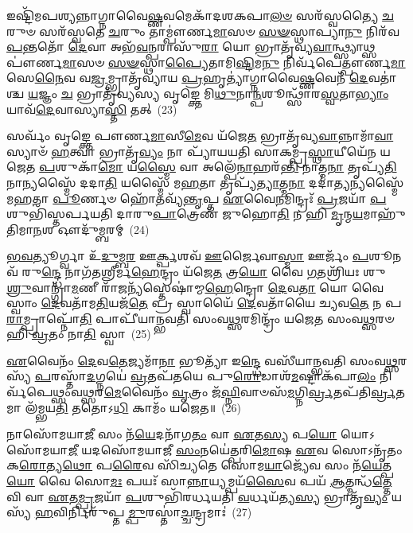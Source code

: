 𑌇𑌷𑍍𑌟𑌿᳴𑌮𑌪𑌶𑍍𑌯𑌨𑍍𑌨𑌾𑌗𑍍𑌨𑌾𑌵𑍈\-\ul{𑌷𑍍𑌣}\-𑌵𑌮𑍇𑌕𑌾᳴\-𑌦𑌶\-𑌕𑌪𑌾\-\ul{𑌲}\-\-\ul{𑍞} 𑌸𑌰᳴𑌸𑍍𑌵𑌤𑍍𑌯𑍈 \ul{𑌚}\-𑌰𑍁𑍞 𑌸𑌰᳴𑌸𑍍𑌵𑌤𑍇 \ul{𑌚}\-𑌰𑍁𑌂 𑌤𑌾𑌮𑍍𑌪𑍗॑𑌰𑍍𑌣\-\ul{𑌮𑌾}\-𑌸𑍞 \ul{𑌸}\-\-\ul{𑍟}\-𑌸𑍍𑌥𑌾𑌪𑍍𑌯𑌾\-\ul{𑌨𑍁} 𑌨𑌿𑌰᳴𑌵\-\ul{𑌪}\-𑌨𑍍𑌤𑌤𑍋᳴ \ul{𑌦𑍇}\-𑌵𑌾 𑌅𑌭᳴\-\ul{𑌵}\-𑌨𑍍𑌪𑌰𑌾𑌸𑍁᳴\-\ul{𑌰𑌾} 𑌯𑍋 𑌭𑍍𑌰𑌾𑌤𑍃᳴𑌵𑍍𑌯\-\ul{𑌵𑌾}\-𑌨𑍍𑌥𑍍𑌸𑍍𑌯𑌾𑌥𑍍𑌸 𑌪𑍗॑𑌰𑍍𑌣\-\ul{𑌮𑌾}\-𑌸𑍞 \ul{𑌸}\-\-\ul{𑍟}\-𑌸𑍍𑌥𑌾\-\ul{𑌪𑍍𑌯𑍈}\-𑌤𑌾𑌮𑌿\-\ul{𑌷𑍍𑌟𑌿}\-𑌮\-\ul{𑌨𑍁} 𑌨𑌿𑌰𑍍𑌵᳴𑌪𑍇𑌤𑍍𑌪𑍗𑌰𑍍𑌣\-\ul{𑌮𑌾}\-𑌸𑍇\-\ul{𑌨𑍈}\-𑌵 𑌵\-\ul{𑌜𑍍𑌰}\-𑌮𑍍𑌭𑍍𑌰𑌾𑌤𑍃᳴𑌵𑍍𑌯𑌾𑌯 \ul{𑌪𑍍𑌰}\-𑌹𑍃𑌤𑍍𑌯𑌾॑𑌗𑍍𑌨𑌾𑌵𑍈\-\ul{𑌷𑍍𑌣}\-𑌵𑍇𑌨᳴ \ul{𑌦𑍇}\-𑌵𑌤𑌾॑𑌶𑍍𑌚 \ul{𑌯}\-𑌜𑍍𑌞𑌂 \ul{𑌚} 𑌭𑍍𑌰𑌾𑌤𑍃᳴𑌵𑍍𑌯𑌸𑍍𑌯 𑌵𑍃𑌙𑍍𑌕𑍍𑌤𑍇 𑌮𑌿\-\ul{𑌥𑍁}\-𑌨𑌾\-\ul{𑌨𑍍𑌪}\-𑌶𑍂𑌨𑍍𑌥𑍍𑌸𑌾᳴𑌰\-\ul{𑌸𑍍𑌵}\-𑌤𑌾\-\ul{𑌭𑍍𑌯𑌾𑌂} 𑌯𑌾𑌵᳴\-\ul{𑌦𑍇}\-𑌵𑌾𑌸𑍍𑌯𑌾\-\ul{𑌸𑍍𑌤𑌿} 𑌤𑌤𑍍~(23)

𑌸𑌰𑍍𑌵𑌂᳴ 𑌵𑍃𑌙𑍍𑌕𑍍𑌤𑍇 𑌪𑍗𑌰𑍍𑌣\-\ul{𑌮𑌾}\-𑌸𑍀\-\ul{𑌮𑍇}\-𑌵 𑌯᳴𑌜𑍇\-\ul{𑌤} 𑌭𑍍𑌰𑌾𑌤𑍃᳴𑌵𑍍𑌯\-\ul{𑌵𑌾}\-𑌨𑍍𑌨𑌾𑌮𑌾᳴\-\ul{𑌵𑌾}\-𑌸𑍍𑌯𑌾𑍞᳴ \ul{𑌹}\-𑌤𑍍𑌵𑌾 𑌭𑍍𑌰𑌾𑌤𑍃᳴\-\ul{𑌵𑍍𑌯𑌂} 𑌨𑌾 𑌪𑍍𑌯𑌾᳴𑌯𑌯𑌤𑌿 𑌸𑌾𑌕𑌮𑍍𑌪𑍍𑌰\-\ul{𑌸𑍍𑌥𑌾}\-𑌯𑍀𑌯𑍇᳴𑌨 𑌯𑌜𑍇𑌤 \ul{𑌪}\-𑌶𑍁𑌕𑌾᳴\-\ul{𑌮𑍋} 𑌯\-\ul{𑌸𑍍𑌮𑍈} 𑌵𑌾 𑌅𑌲𑍍𑌪𑍇᳴\-\ul{𑌨𑌾}\-𑌹𑌰᳴\-\ul{𑌨𑍍𑌤𑌿} 𑌨𑌾𑌤𑍍𑌮\-\ul{𑌨𑌾} 𑌤𑍃𑌪𑍍𑌯᳴\-\ul{𑌤𑌿} 𑌨𑌾𑌨𑍍𑌯𑌸𑍍𑌮𑍈᳴ 𑌦𑌦𑌾\-\ul{𑌤𑌿} 𑌯𑌸𑍍𑌮𑍈᳴ 𑌮\-\ul{𑌹}\-𑌤𑌾 𑌤𑍃𑌪𑍍𑌯᳴\-\ul{𑌤𑍍𑌯𑌾}\-𑌤𑍍𑌮\-\ul{𑌨𑌾} 𑌦𑌦𑌾॑\-\ul{𑌤𑍍𑌯}\-𑌨𑍍𑌯𑌸𑍍𑌮𑍈᳴ 𑌮\-\ul{𑌹}\-𑌤𑌾 \ul{𑌪𑍂}\-𑌰𑍍𑌣𑍞 𑌹𑍋᳴\-\ul{𑌤}\-𑌵𑍍𑌯᳴\-\ul{𑌨𑍍𑌤𑍃}\-𑌪𑍍𑌤 \ul{𑌏}\-𑌵𑍈\-\ul{𑌨}\-𑌮𑌿𑌨𑍍𑌦𑍍𑌰𑌃᳴ \ul{𑌪𑍍𑌰}\-𑌜𑌯𑌾᳴ \ul{𑌪}\-𑌶𑍁𑌭𑌿᳴𑌸𑍍𑌤𑌰𑍍𑌪𑌯𑌤𑌿 𑌦𑌾𑌰𑍁\-\ul{𑌪𑌾}\-𑌤𑍍𑌰𑍇𑌣᳴ 𑌜𑍁𑌹𑍋\-\ul{𑌤𑌿} 𑌨 𑌹𑌿 \ul{𑌮𑍃}\-𑌨𑍍𑌮\-\ul{𑌯}\-𑌮𑌾𑌹𑍁᳴𑌤𑌿𑌮𑌾\-\ul{𑌨}\-𑌶 𑌔𑌦𑍁᳴𑌮𑍍𑌬𑌰𑌮𑍍~(24)

\-\ul{𑌭}\-\-\ul{𑌵}\-𑌤𑍍𑌯𑍂𑌰𑍍𑌗𑍍𑌵𑌾 𑌉᳴\-\ul{𑌦𑍁}\-𑌮𑍍𑌬\-\ul{𑌰} 𑌊\-\ul{𑌰𑍍𑌕𑍍𑌪}\-𑌶𑌵᳴ \ul{𑌊}\-𑌰𑍍𑌜𑍈𑌵𑌾\-\ul{𑌸𑍍𑌮𑌾} 𑌊𑌰𑍍𑌜𑌂᳴ \ul{𑌪}\-𑌶𑍂𑌨𑌵᳴ 𑌰𑍁\-\ul{𑌨𑍍𑌦𑍍𑌧𑍇} 𑌨𑌾𑌗᳴𑌤𑌶𑍍𑌰𑍀𑌰𑍍𑌮\-\ul{𑌹𑍇}\-𑌨𑍍𑌦𑍍𑌰𑌂 𑌯᳴𑌜𑍇\-\ul{𑌤} 𑌤𑍍𑌰\-\ul{𑌯𑍋} 𑌵𑍈 \ul{𑌗}\-𑌤𑌶𑍍𑌰𑌿᳴𑌯𑌃 𑌶𑍁\-\ul{𑌶𑍍𑌰𑍁}\-𑌵𑌾𑌨𑍍𑌗𑍍𑌰𑌾᳴\-\ul{𑌮}\-𑌣𑍀 𑌰𑌾᳴\-\ul{𑌜}\-𑌨𑍍𑌯᳴𑌸𑍍𑌤𑍇𑌷𑌾॑𑌮𑍍𑌮\-\ul{𑌹𑍇}\-𑌨𑍍𑌦𑍍𑌰𑍋 \ul{𑌦𑍇}\-𑌵\-\ul{𑌤𑌾} 𑌯𑍋 𑌵𑍈 𑌸𑍍𑌵𑌾𑌂 \ul{𑌦𑍇}\-𑌵𑌤𑌾᳴𑌮\-\ul{𑌤𑌿}\-𑌯𑌜᳴\-\ul{𑌤𑍇} 𑌪𑍍𑌰 𑌸𑍍𑌵𑌾𑌯𑍈᳴ \ul{𑌦𑍇}\-𑌵𑌤𑌾᳴𑌯𑍈 𑌚𑍍𑌯𑌵\-\ul{𑌤𑍇} 𑌨 𑌪\-\ul{𑌰𑌾}\-𑌮𑍍𑌪𑍍𑌰𑌾𑌪𑍍𑌨𑍋᳴\-\ul{𑌤𑌿} 𑌪𑌾𑌪𑍀᳴𑌯𑌾𑌨𑍍𑌭𑌵𑌤𑌿 𑌸𑌂𑌵\-\ul{𑌥𑍍𑌸}\-𑌰𑌮𑌿𑌨𑍍𑌦𑍍𑌰𑌂᳴ 𑌯𑌜𑍇𑌤 𑌸𑌂𑌵\-\ul{𑌥𑍍𑌸}\-𑌰𑍞 𑌹𑌿 \ul{𑌵𑍍𑌰}\-𑌤𑌂 𑌨𑌾\-\ul{𑌤𑌿} 𑌸𑍍𑌵𑌾~(25)

\-\ul{𑌏}\-𑌵𑍈𑌨𑌂᳴ \ul{𑌦𑍇}\-𑌵\-\ul{𑌤𑍇}\-𑌜𑍍𑌯𑌮𑌾᳴\-\ul{𑌨𑌾} 𑌭𑍂𑌤𑍍𑌯𑌾᳴ 𑌇\-\ul{𑌨𑍍𑌦𑍍𑌧𑍇} 𑌵𑌸𑍀᳴𑌯𑌾𑌨𑍍𑌭𑌵𑌤𑌿 𑌸𑌂𑌵\-\ul{𑌥𑍍𑌸}\-𑌰𑌸𑍍𑌯᳴ \ul{𑌪}\-𑌰𑌸𑍍𑌤𑌾᳴\-\ul{𑌦}\-𑌗𑍍𑌨𑌯𑍇॑ \ul{𑌵𑍍𑌰}\-𑌤𑌪᳴𑌤𑌯𑍇 𑌪𑍁\-\ul{𑌰𑍋}\-𑌡𑌾𑌶᳴\-\-\ul{𑌮}\-𑌷𑍍𑌟𑌾\-𑌕᳴𑌪𑌾\-\ul{𑌲𑌂} 𑌨𑌿𑌰𑍍𑌵᳴𑌪𑍇𑌥𑍍𑌸𑌂𑌵\-\ul{𑌥𑍍𑌸}\-𑌰\-\ul{𑌮𑍇}\-𑌵𑍈𑌨𑌂᳴ \ul{𑌵𑍃}\-𑌤𑍍𑌰𑌂 𑌜᳴\-\ul{𑌘𑍍𑌨𑌿}\-𑌵𑌾𑍞𑌸᳴\-\ul{𑌮}\-𑌗𑍍𑌨𑌿\-\ul{𑌰𑍍𑌵𑍍𑌰}\-𑌤𑌪᳴𑌤𑌿\-\ul{𑌰𑍍𑌵𑍍𑌰}\-𑌤𑌮𑌾 𑌲᳴𑌮𑍍𑌭𑌯\-\ul{𑌤𑌿} 𑌤𑌤𑍋\-𑌽\-\ul{𑌧𑌿} 𑌕𑌾𑌮𑌂᳴ 𑌯𑌜𑍇𑌤॥~(26)

{\anuvakamend[{\-\ul{𑌏}\-𑌤𑌾𑌨𑍍𑌤𑌦𑍗𑌦𑍁᳴𑌮𑍍𑌬\-\ul{𑌰}\-\-\ul{𑍟} 𑌸𑍍𑌵𑌾 \ul{𑌤𑍍𑌰𑌿}\-\-\ul{𑍞}\-𑌶𑌚𑍍𑌚᳴}]}%

𑌨𑌾𑌸𑍋᳴𑌮𑌯𑌾\-\ul{𑌜𑍀} 𑌸𑌂 𑌨᳴\-\ul{𑌯𑍇}\-𑌦𑌨𑌾᳴𑌗\-\ul{𑌤𑌂} 𑌵𑌾 \ul{𑌏}\-𑌤\-\ul{𑌸𑍍𑌯} 𑌪\-\ul{𑌯𑍋} 𑌯𑍋\-𑌽𑌸𑍋᳴𑌮𑌯𑌾\-\ul{𑌜𑍀} 𑌯𑌦𑌸𑍋᳴𑌮𑌯𑌾𑌜𑍀 \ul{𑌸𑌂}\-𑌨𑌯𑍇॑𑌤𑍍𑌪𑌰𑌿\-\ul{𑌮𑍋}\-𑌷 \ul{𑌏}\-𑌵 𑌸𑍋\-𑌽𑌨𑍃᳴𑌤𑌂 𑌕\-\ul{𑌰𑍋}\-𑌤𑍍𑌯\-\ul{𑌥𑍋} 𑌪\-\ul{𑌰𑍈}\-𑌵 𑌸𑌿᳴𑌚𑍍𑌯𑌤𑍇 𑌸𑍋𑌮\-\ul{𑌯𑌾}\-𑌜𑍍𑌯𑍇᳴𑌵 𑌸𑌂 𑌨᳴\-\ul{𑌯𑍇}\-𑌤𑍍𑌪\-\ul{𑌯𑍋} 𑌵𑍈 𑌸𑍋\-\ul{𑌮𑌃} 𑌪𑌯𑌃᳴ 𑌸𑌾\-\ul{𑌨𑍍𑌨𑌾}\-𑌯𑍍𑌯𑌮𑍍𑌪𑌯᳴\-\ul{𑌸𑍈}\-𑌵 𑌪𑌯᳴ \ul{𑌆}\-𑌤𑍍𑌮𑌨𑍍𑌧᳴\-\ul{𑌤𑍍𑌤𑍇} 𑌵𑌿 𑌵𑌾 \ul{𑌏}\-𑌤\-\ul{𑌮𑍍𑌪𑍍𑌰}\-𑌜𑌯𑌾᳴ \ul{𑌪}\-𑌶𑍁𑌭𑌿᳴𑌰𑌰𑍍𑌧𑌯𑌤𑌿 \ul{𑌵}\-𑌰𑍍𑌧𑌯᳴𑌤𑍍𑌯\-\ul{𑌸𑍍𑌯} 𑌭𑍍𑌰𑌾𑌤𑍃᳴\-\ul{𑌵𑍍𑌯𑌂} 𑌯𑌸𑍍𑌯᳴ \ul{𑌹}\-𑌵𑌿𑌰𑍍𑌨𑌿𑌰𑍁᳴𑌪𑍍𑌤\-\ul{𑌮𑍍𑌪𑍁}\-𑌰𑌸𑍍𑌤𑌾॑\-\ul{𑌚𑍍𑌚}\-𑌨𑍍𑌦𑍍𑌰𑌮𑌾𑌃॑~(27)

